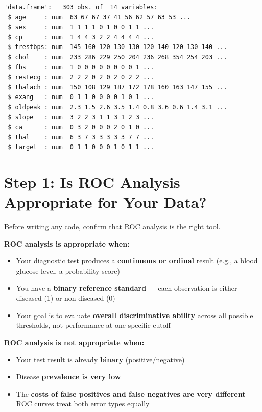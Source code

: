 \documentclass[
  letterpaper,
  DIV=11,
  numbers=noendperiod]{scrreprt}
\providecommand{\tightlist}{%
  \setlength{\itemsep}{0pt}\setlength{\parskip}{0pt}}\usepackage{longtable,booktabs,array}
\begin{document}
\begin{verbatim}
'data.frame':   303 obs. of  14 variables:
 $ age     : num  63 67 67 37 41 56 62 57 63 53 ...
 $ sex     : num  1 1 1 1 0 1 0 0 1 1 ...
 $ cp      : num  1 4 4 3 2 2 4 4 4 4 ...
 $ trestbps: num  145 160 120 130 130 120 140 120 130 140 ...
 $ chol    : num  233 286 229 250 204 236 268 354 254 203 ...
 $ fbs     : num  1 0 0 0 0 0 0 0 0 1 ...
 $ restecg : num  2 2 2 0 2 0 2 0 2 2 ...
 $ thalach : num  150 108 129 187 172 178 160 163 147 155 ...
 $ exang   : num  0 1 1 0 0 0 0 1 0 1 ...
 $ oldpeak : num  2.3 1.5 2.6 3.5 1.4 0.8 3.6 0.6 1.4 3.1 ...
 $ slope   : num  3 2 2 3 1 1 3 1 2 3 ...
 $ ca      : num  0 3 2 0 0 0 2 0 1 0 ...
 $ thal    : num  6 3 7 3 3 3 3 3 7 7 ...
 $ target  : num  0 1 1 0 0 0 1 0 1 1 ...
\end{verbatim}

\section{Step 1: Is ROC Analysis Appropriate for Your
Data?}\label{step-1-is-roc-analysis-appropriate-for-your-data}

Before writing any code, confirm that ROC analysis is the right tool.

\textbf{ROC analysis is appropriate when:}

\begin{itemize}
\tightlist
\item
  Your diagnostic test produces a \textbf{continuous or ordinal} result
  (e.g., a blood glucose level, a probability score)
\item
  You have a \textbf{binary reference standard} --- each observation is
  either diseased (1) or non-diseased (0)
\item
  Your goal is to evaluate \textbf{overall discriminative ability}
  across all possible thresholds, not performance at one specific cutoff
\end{itemize}

\textbf{ROC analysis is not appropriate when:}

\begin{itemize}
\tightlist
\item
  Your test result is already \textbf{binary} (positive/negative)
\item
  Disease \textbf{prevalence is very low}
\item
  The \textbf{costs of false positives and false negatives are very
  different} --- ROC curves treat both error types equally
\end{itemize}
\end{document}
